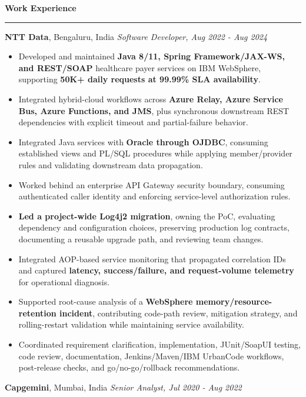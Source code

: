\documentclass[11pt,letterpaper]{article}
\newcommand{\ressection}[1]{\Needspace{6\baselineskip}\vspace{8pt}\par\textbf{#1}\par\vspace{2pt}\hrule\vspace{5pt}}
\begin{document}
\ressection{Work Experience}
\textbf{NTT Data}, Bengaluru, India \hfill \textit{Software Developer, Aug 2022 - Aug 2024}
\begin{itemize}
  \item Developed and maintained \textbf{Java 8/11, Spring Framework/JAX-WS, and REST/SOAP} healthcare payer services on IBM WebSphere, supporting \textbf{50K+ daily requests at 99.99\% SLA availability}.
  \item Integrated hybrid-cloud workflows across \textbf{Azure Relay, Azure Service Bus, Azure Functions, and JMS}, plus synchronous downstream REST dependencies with explicit timeout and partial-failure behavior.
  \item Integrated Java services with \textbf{Oracle through OJDBC}, consuming established views and PL/SQL procedures while applying member/provider rules and validating downstream data propagation.
  \item Worked behind an enterprise API Gateway security boundary, consuming authenticated caller identity and enforcing service-level authorization rules.
  \item \textbf{Led a project-wide Log4j2 migration}, owning the PoC, evaluating dependency and configuration choices, preserving production log contracts, documenting a reusable upgrade path, and reviewing team changes.
  \item Integrated AOP-based service monitoring that propagated correlation IDs and captured \textbf{latency, success/failure, and request-volume telemetry} for operational diagnosis.
  \item Supported root-cause analysis of a \textbf{WebSphere memory/resource-retention incident}, contributing code-path review, mitigation strategy, and rolling-restart validation while maintaining service availability.
  \item Coordinated requirement clarification, implementation, JUnit/SoapUI testing, code review, documentation, Jenkins/Maven/IBM UrbanCode workflows, post-release checks, and go/no-go/rollback recommendations.
\end{itemize}
\textbf{Capgemini}, Mumbai, India \hfill \textit{Senior Analyst, Jul 2020 - Aug 2022}
\end{document}
